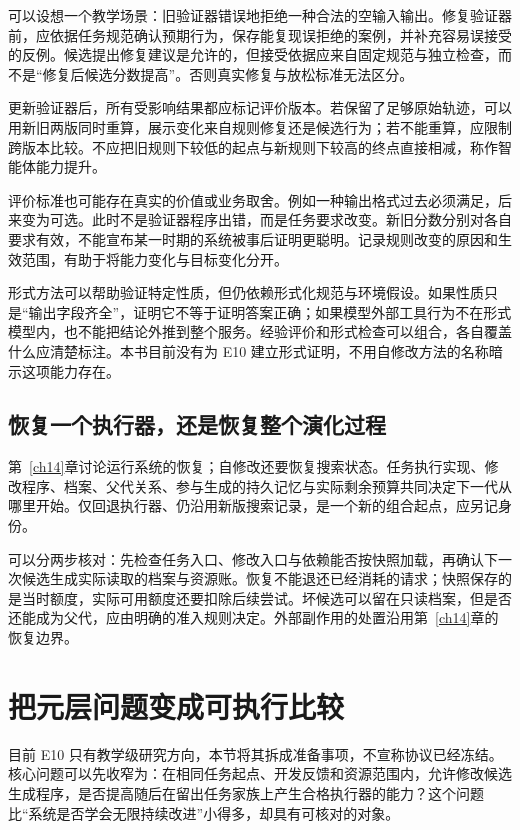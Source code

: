 可以设想一个教学场景：旧验证器错误地拒绝一种合法的空输入输出。修复验证器前，应依据任务规范确认预期行为，保存能复现误拒绝的案例，并补充容易误接受的反例。候选提出修复建议是允许的，但接受依据应来自固定规范与独立检查，而不是“修复后候选分数提高”。否则真实修复与放松标准无法区分。

更新验证器后，所有受影响结果都应标记评价版本。若保留了足够原始轨迹，可以用新旧两版同时重算，展示变化来自规则修复还是候选行为；若不能重算，应限制跨版本比较。不应把旧规则下较低的起点与新规则下较高的终点直接相减，称作智能体能力提升。

评价标准也可能存在真实的价值或业务取舍。例如一种输出格式过去必须满足，后来变为可选。此时不是验证器程序出错，而是任务要求改变。新旧分数分别对各自要求有效，不能宣布某一时期的系统被事后证明更聪明。记录规则改变的原因和生效范围，有助于将能力变化与目标变化分开。

形式方法可以帮助验证特定性质，但仍依赖形式化规范与环境假设。如果性质只是“输出字段齐全”，证明它不等于证明答案正确；如果模型外部工具行为不在形式模型内，也不能把结论外推到整个服务。经验评价和形式检查可以组合，各自覆盖什么应清楚标注。本书目前没有为 E10 建立形式证明，不用自修改方法的名称暗示这项能力存在。

\subsection{恢复一个执行器，还是恢复整个演化过程}
\label{sec:ch12-restore}

第~\ref{ch14}章讨论运行系统的恢复；自修改还要恢复搜索状态。任务执行实现、修改程序、档案、父代关系、参与生成的持久记忆与实际剩余预算共同决定下一代从哪里开始。仅回退执行器、仍沿用新版搜索记录，是一个新的组合起点，应另记身份。

可以分两步核对：先检查任务入口、修改入口与依赖能否按快照加载，再确认下一次候选生成实际读取的档案与资源账。恢复不能退还已经消耗的请求；快照保存的是当时额度，实际可用额度还要扣除后续尝试。坏候选可以留在只读档案，但是否还能成为父代，应由明确的准入规则决定。外部副作用的处置沿用第~\ref{ch14}章的恢复边界。

\section{把元层问题变成可执行比较}
\label{sec:ch12-e10design}

目前 E10 只有教学级研究方向，本节将其拆成准备事项，不宣称协议已经冻结。核心问题可以先收窄为：在相同任务起点、开发反馈和资源范围内，允许修改候选生成程序，是否提高随后在留出任务家族上产生合格执行器的能力？这个问题比“系统是否学会无限持续改进”小得多，却具有可核对的对象。

